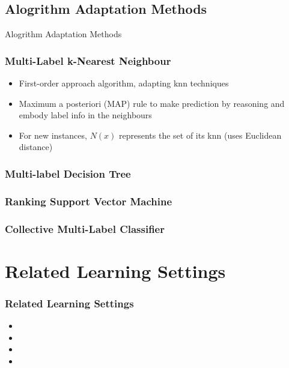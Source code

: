 \documentclass{beamer}
\begin{document}
\subsection{Alogrithm Adaptation Methods}
\begin{frame}
\Huge{\centerline{Alogrithm Adaptation Methods}}
\end{frame}
\begin{frame}
\frametitle{Multi-Label k-Nearest Neighbour}
\begin{itemize}
	\item First-order approach algorithm, adapting knn techniques
	\item Maximum a posteriori (MAP) rule to make prediction by reasoning and embody label info in the neighbours
	\item For new instances, $N(x)$ represents the set of its knn (uses Euclidean distance)
	
\end{itemize}
\end{frame}

\begin{frame}
\frametitle{Multi-label Decision Tree}

\end{frame}
\begin{frame}
\frametitle{Ranking Support Vector Machine}

\end{frame}
\begin{frame}
\frametitle{Collective Multi-Label Classifier}

\end{frame}
\section{Related Learning Settings}

\begin{frame}
\frametitle{Related Learning Settings}
\begin{itemize}
\item 
\item 
\item 
\item 
\end{itemize}
\end{frame}
\end{document}

